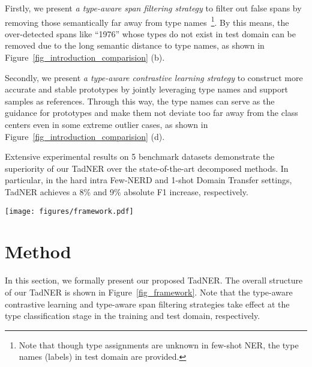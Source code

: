 \documentclass[11pt]{article}
\newcommand{\ours}{{TadNER}\xspace}
\begin{document}
Firstly, we present \emph{a type-aware span filtering strategy} to filter out false spans by removing those semantically far away from type names~\footnote{Note that though  type assignments are unknown in few-shot NER, the type names (labels) in test domain are provided.}. By this means, the over-detected spans like ``1976'' whose types do not exist in test domain can be removed due to the long semantic distance to type names, as shown in Figure~\ref{fig_introduction_comparision} (b).

Secondly, we  present \emph{a type-aware contrastive learning strategy} to construct  more accurate and stable prototypes by jointly leveraging  type names and support  samples as references. Through this way,  the type names can serve as the guidance for prototypes and make them  not deviate  too far away from the class centers even in some extreme outlier cases, as shown in Figure~\ref{fig_introduction_comparision} (d).

Extensive experimental results  on 5 benchmark datasets demonstrate the superiority of our \ours over the state-of-the-art decomposed methods. In particular, in the hard intra Few-NERD and 1-shot Domain Transfer settings, \ours achieves a 8\% and 9\% absolute F1 increase, respectively.


\begin{figure*}[tbh!]
\centering
\texttt{[image: figures/framework.pdf]}
\caption{The overall structure of our proposed \ours framework. (a) Training in the source domain. (b) Inference on the query set by utilizing the support samples in the target domain. Note that the source and target domains have different entity type sets.
}
\label{fig_framework}
\vspace{-0mm}
\end{figure*}

\section{Method}




In this section, we formally present our proposed \ours. The overall structure of our \ours is shown in Figure~\ref{fig_framework}.
Note that the type-aware contrastive learning and type-aware span filtering strategies take effect at the type classification stage in the training and test domain, respectively.
\end{document}
